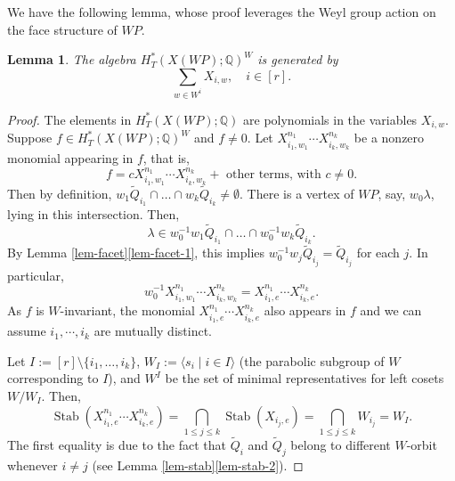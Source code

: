 \documentclass{amsart}
\newtheorem{lemma}[theorem]{Lemma}
\theoremstyle{definition}
\theoremstyle{remark}
\numberwithin{equation}{section}
\begin{document}
We have the following lemma, whose proof leverages the Weyl group action on the face structure of $\mathit{WP}$.
\begin{lemma} \label{lem-T-coh-gen}
    The algebra $H^*_T(X(\mathit{WP}) ; \mathbb{Q})^W$ is generated by 
    \[\sum_{w \in W^i} X_{i,w}, \quad i \in [r].\]
\end{lemma}

\begin{proof}
    The elements in $H^*_T(X(\mathit{WP}) ; \mathbb{Q})$ are polynomials in the variables $X_{i,w}$.
    Suppose $f \in H^*_T(X(\mathit{WP}) ; \mathbb{Q})^W$ and $f \ne 0$.
    Let $X_{i_1, w_1}^{n_1} \cdots X_{i_k, w_k}^{n_k}$ be a nonzero monomial appearing in $f$, that is,
    \[f = c X_{i_1, w_1}^{n_1} \cdots X_{i_k, w_k}^{n_k} + \text{ other terms, with $c \ne 0$}.\]
    Then by definition, $w_1 \widetilde{Q}_{i_1} \cap \dots \cap w_k \widetilde{Q}_{i_k} \ne \emptyset$.
    There is a vertex of $\mathit{WP}$, say, $w_0\lambda$, lying in this intersection.
    Then, 
    \[\lambda \in w_0^{-1} w_1 \widetilde{Q}_{i_1} \cap \dots \cap w_0^{-1} w_k \widetilde{Q}_{i_k}.\] 
    By Lemma \ref{lem-facet}\eqref{lem-facet-1}, this implies $w_0^{-1} w_j \widetilde{Q}_{i_j} = \widetilde{Q}_{i_j}$ for each $j$. 
    In particular,
    \[w_0^{-1} X_{i_1, w_1}^{n_1} \cdots X_{i_k, w_k}^{n_k} = X_{i_1, e}^{n_1} \cdots X_{i_k, e}^{n_k}.\]
    As $f$ is $W$-invariant, the monomial $X_{i_1, e}^{n_1} \cdots X_{i_k, e}^{n_k}$ also appears in $f$ and we can assume $i_1, \cdots, i_k$ are mutually distinct.

    Let $I := [r] \setminus \{i_1, \dots, i_k\}$, $W_I := \langle s_i \mid i\in I \rangle$ (the parabolic subgroup of $W$ corresponding to $I$), and $W^I$ be the set of minimal representatives for left cosets $W / W_I$.
    Then,
    \[\operatorname{Stab}(X_{i_1, e}^{n_1} \cdots X_{i_k, e}^{n_k}) = \bigcap_{1 \le j \le k} \operatorname{Stab}(X_{i_j,e}) = \bigcap_{1 \le j \le k} W_{i_j} = W_I.\]
    The first equality is due to the fact that $\widetilde{Q}_i$ and $\widetilde{Q}_j$ belong to different $W$-orbit whenever $i \ne j$ (see Lemma \ref{lem-stab}\eqref{lem-stab-2}).
    

\end{proof}
\end{document}
